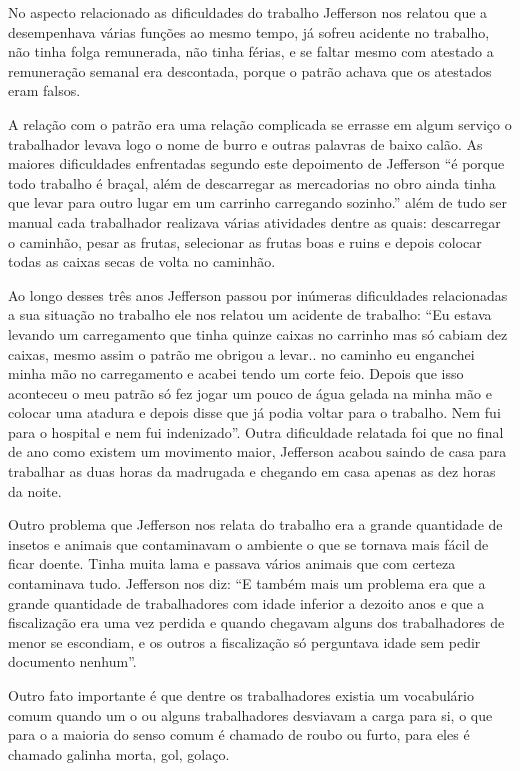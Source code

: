  No aspecto relacionado as dificuldades do trabalho Jefferson nos relatou que a desempenhava várias
 funções ao mesmo tempo, já sofreu acidente no trabalho, não tinha folga remunerada, não tinha
 férias, e se faltar mesmo com atestado a remuneração semanal era descontada, porque o patrão 
 achava que os atestados eram falsos. 
 
 A relação com o patrão era uma relação complicada se errasse
 em algum serviço o trabalhador levava logo o nome de burro e outras palavras de baixo calão. 
 As maiores dificuldades enfrentadas segundo este depoimento de Jefferson ``é porque todo trabalho 
 é braçal, além de descarregar as mercadorias no obro ainda tinha que levar para outro lugar em
 um carrinho carregando sozinho.'' além de tudo ser manual cada trabalhador realizava várias atividades
 dentre as quais: descarregar o caminhão, pesar as frutas, selecionar as frutas boas e ruins e depois 
 colocar todas as caixas secas de volta no caminhão.

 Ao longo desses três anos Jefferson passou por inúmeras dificuldades relacionadas a sua situação no
 trabalho ele nos relatou um acidente de trabalho: ``Eu estava levando um carregamento que tinha quinze 
 caixas no carrinho mas só cabiam dez caixas, mesmo assim o patrão me obrigou a levar.. no caminho eu 
 enganchei minha mão no carregamento e acabei tendo um corte feio. Depois que isso aconteceu o meu 
 patrão só fez jogar um pouco de água gelada na minha mão e colocar uma atadura e depois disse que já
 podia voltar para o trabalho. Nem fui para o hospital e nem fui indenizado''. Outra dificuldade relatada
 foi que no final de ano como existem um movimento maior, Jefferson acabou saindo de casa para trabalhar
 as duas horas da madrugada e chegando em casa apenas as dez horas da noite.

 Outro problema que Jefferson nos relata do trabalho era a grande quantidade de insetos e animais que 
 contaminavam o ambiente o que se tornava mais fácil de ficar doente. Tinha muita lama e passava vários
 animais que com certeza contaminava tudo. Jefferson nos diz: ``E também mais um problema era que a 
 grande quantidade de trabalhadores com idade inferior a dezoito anos e que a fiscalização era uma vez
 perdida e quando chegavam alguns dos trabalhadores de menor se escondiam, e os outros a fiscalização
 só perguntava idade sem pedir documento nenhum''. 
 
 Outro fato importante é que dentre os trabalhadores 
 existia um vocabulário comum quando um o ou alguns trabalhadores desviavam a carga para si, o que para 
 o a maioria do senso comum é chamado de roubo ou furto, para eles é chamado galinha morta, gol, golaço.
 
